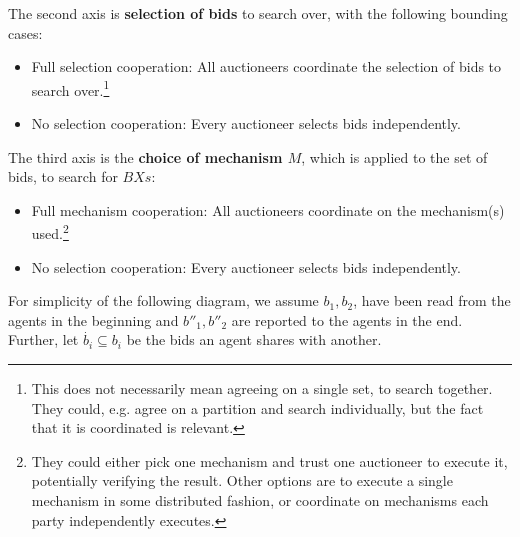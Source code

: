 The second axis is \textbf{selection of bids} to search over, with the following bounding cases:
\begin{itemize}
    \item Full selection cooperation: All auctioneers coordinate the selection of bids to search over.\footnote{This does not necessarily mean agreeing on a single set, to search together. They could, e.g. agree on a partition and search individually, but the fact that it is coordinated is relevant.}
    \item No selection cooperation: Every auctioneer selects bids independently.
\end{itemize}

The third axis is the \textbf{choice of mechanism $M$}, which is applied to the set of bids, to search for $BXs$:
\begin{itemize}
    \item Full mechanism cooperation: All auctioneers coordinate on the mechanism(s) used.\footnote{They could either pick one mechanism and trust one auctioneer to execute it, potentially verifying the result. Other options are to execute a single mechanism in some distributed fashion, or coordinate on mechanisms each party independently executes.}
    \item No selection cooperation: Every auctioneer selects bids independently.
\end{itemize}

\vspace{1em}

For simplicity of the following diagram, we assume $b_1, b_2$, have been read from the agents in the beginning and $b''_1, b''_2$ are reported to the agents in the end. Further, let $\dot{b_i} \subseteq b_i$ be the bids an agent shares with another.


